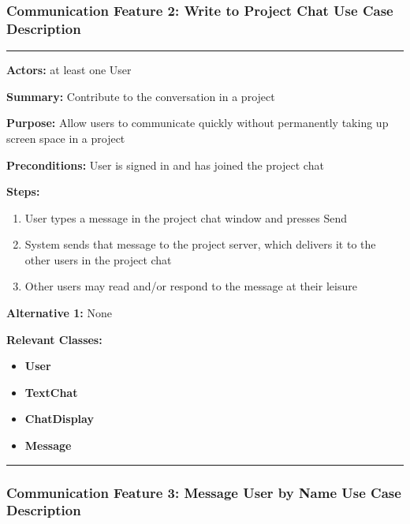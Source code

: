 \documentclass[twoside,letterpaper]{article}
\begin{document}
\subsubsection[Communication Feature 2: Write to Project Chat Use Case Description]{\rmfamily\bfseries\color{black}
	Communication Feature 2: Write to Project Chat Use Case Description}
\hypertarget{RefHeading22059017292}{}

\vspace{2pt}
\hrule
\vspace{8pt}
\textbf{Actors:} at least one User \newline

\noindent\textbf{Summary:} Contribute to the conversation in a project  \newline

\noindent\textbf{Purpose:} Allow users to communicate quickly without permanently taking up screen space in a project \newline

\noindent\textbf{Preconditions:} User is signed in and has joined the project chat \newline

\noindent\textbf{Steps:} \begin{enumerate}
	\item User types a message in the project chat window and presses Send
	\item System sends that message to the project server, which delivers it to the other users in the project chat
	\item Other users may read and/or respond to the message at their leisure
\end{enumerate}
\noindent\textbf{Alternative 1:} None \newline


\noindent\textbf{Relevant Classes:}
\begin{itemize}
	\item \textbf{User}
	\item \textbf{TextChat}
	\item \textbf{ChatDisplay}
	\item \textbf{Message}
\end{itemize}
\hrule
\newpage

\subsubsection[Communication Feature 3: Message User by Name Use Case Description]{\rmfamily\bfseries\color{black}
	Communication Feature 3: Message User by Name Use Case Description}
\hypertarget{RefHeading22059017292}{}
\end{document}
